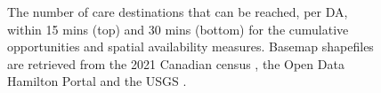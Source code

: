 \documentclass[
  authoryear,
  preprint,
  3p]{elsarticle}
\begin{document}
\begin{figure}


\caption{\label{fig-Fig5}The number of care destinations that can be
reached, per DA, within 15 mins (top) and 30 mins (bottom) for the
cumulative opportunities and spatial availability measures. Basemap
shapefiles are retrieved from the 2021 Canadian census
\citep{governmentofcanadaCensusPopulation2023}, the Open Data Hamilton
Portal \citep{opendatahamiltonCityBoundary2023} and the USGS
\citep{greatlakesUSGS2010}.}

\end{figure}%
\end{document}
